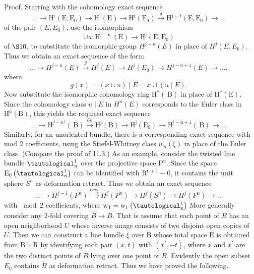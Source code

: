 \documentclass[10pt]{article}
\begin{document}
Proof. Starting with the cohomology exact sequence
$$
\ldots \rightarrow \mathrm{H}^{\mathrm{j}}\left(\mathrm{E}, \mathrm{E}_{0}\right) \rightarrow \mathrm{H}^{\mathrm{j}}(\mathrm{E}) \rightarrow \mathrm{H}^{\mathrm{j}}\left(\mathrm{E}_{0}\right) \stackrel{\delta}{\rightarrow} \mathrm{H}^{\mathrm{j}+1}\left(\mathrm{E}, \mathrm{E}_{0}\right) \rightarrow \ldots
$$
of the pair $\left(E, E_{0}\right)$, use the isomorphism
$$
\cup u: \mathrm{H}^{\mathrm{j}-\mathrm{n}_{(}}(\mathrm{E}) \rightarrow \mathrm{H}^{\mathrm{j}}\left(\mathrm{E}, \mathrm{E}_{0}\right)
$$
of $\S 10$, to substitute the isomorphic group $H^{j-n}(E)$ in place of $H^{j}\left(E, E_{0}\right)$. Thus we obtain an exact sequence of the form
$$
\ldots \rightarrow H^{j-n}(E) \stackrel{g}{\rightarrow} H^{j}(E) \rightarrow H^{j}\left(E_{0}\right) \rightarrow H^{j-n+1}(E) \rightarrow \ldots,
$$
where
$$
g(x)=(x \cup u) \mid E=x \cup(u \mid E) .
$$
Now substitute the isomorphic cohomology ring $\mathrm{H}^{*}(\mathrm{~B})$ in place of $\mathrm{H}^{*}(\mathrm{E})$. Since the cohomology class $u \mid E$ in $H^{n}(E)$ corresponds to the Euler class in $\mathrm{H}^{\mathrm{n}}(\mathrm{B})$, this yields the required exact sequence
$$
\ldots \longrightarrow \mathrm{H}^{j-n^{j}}(\mathrm{~B}) \stackrel{U \mathrm{e}}{\longrightarrow} \mathrm{H}^{\mathrm{j}}(\mathrm{B}) \longrightarrow \mathrm{H}^{\mathrm{j}}\left(\mathrm{E}_{0}\right) \longrightarrow \mathrm{H}^{\mathrm{j}-\mathrm{n}+1}(\mathrm{~B}) \longrightarrow \ldots
$$
Similarly, for an unoriented bundle, there is a corresponding exact sequence with mod 2 coefficients, using the Stiefel-Whitney class $w_{n}(\xi)$ in place of the Euler class. (Compare the proof of 11.3.) As an example, consider the twisted line bundle $\tautological_{n}^{1}$ over the projective space $\mathrm{P}^{\mathrm{n}}$. Since the space $\mathrm{E}_{0}\left(\tautological_{n}^{1}\right)$ can be identified with $\mathrm{R}^{\mathrm{n}+1}-0$, it contains the unit sphere $S^{n}$ as deformation retract. Thus we obtain an exact sequence
$$
\ldots \longrightarrow H^{j-1}\left(P^{n}\right) \stackrel{U w_{1}}{\longrightarrow} H^{j}\left(P^{n}\right) \longrightarrow H^{j}\left(S^{n}\right) \longrightarrow H^{j}\left(P^{n}\right) \longrightarrow \ldots
$$
with $\bmod 2$ coefficients, where $\mathrm{w}_{1}=\mathrm{w}_{1}\left(\tautological_{\mathrm{n}}^{1}\right)$ More generally consider any 2-fold covering $\widetilde{B} \rightarrow B$. That is assume that each point of $B$ has an open neighborhood $U$ whose inverse image consists of two disjoint open copies of $U$. Then we can construct a line bundle $\xi$ over $\mathrm{B}$ whose total space $\mathrm{E}$ is obtained from $\widetilde{\mathrm{B}} \times \mathrm{R}$ by identifying each pair $(x, t)$ with $\left(x^{\prime},-t\right)$, where $x$ and $x^{\prime}$ are the two distinct points of $\widetilde{B}$ lying over one point of $B$. Evidently the open subset $E_{0}$ contains $\widetilde{B}$ as deformation retract. Thus we have proved the following.
\end{document}
